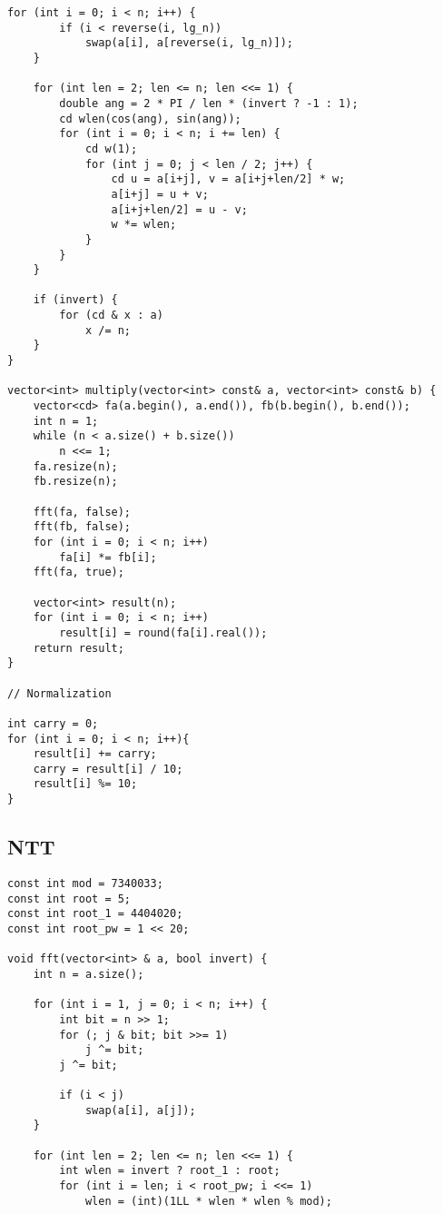 \documentclass[10pt]{article}
\begin{document}
\begin{multicols*}{2}
\begin{lstlisting}[style=compactcpp]
    for (int i = 0; i < n; i++) {
        if (i < reverse(i, lg_n))
            swap(a[i], a[reverse(i, lg_n)]);
    }

    for (int len = 2; len <= n; len <<= 1) {
        double ang = 2 * PI / len * (invert ? -1 : 1);
        cd wlen(cos(ang), sin(ang));
        for (int i = 0; i < n; i += len) {
            cd w(1);
            for (int j = 0; j < len / 2; j++) {
                cd u = a[i+j], v = a[i+j+len/2] * w;
                a[i+j] = u + v;
                a[i+j+len/2] = u - v;
                w *= wlen;
            }
        }
    }

    if (invert) {
        for (cd & x : a)
            x /= n;
    }
}

vector<int> multiply(vector<int> const& a, vector<int> const& b) {
    vector<cd> fa(a.begin(), a.end()), fb(b.begin(), b.end());
    int n = 1;
    while (n < a.size() + b.size()) 
        n <<= 1;
    fa.resize(n);
    fb.resize(n);

    fft(fa, false);
    fft(fb, false);
    for (int i = 0; i < n; i++)
        fa[i] *= fb[i];
    fft(fa, true);

    vector<int> result(n);
    for (int i = 0; i < n; i++)
        result[i] = round(fa[i].real());
    return result;
}

// Normalization

int carry = 0;
for (int i = 0; i < n; i++){
    result[i] += carry;
    carry = result[i] / 10;
    result[i] %= 10;
}

\end{lstlisting}

\subsection{NTT}

\begin{lstlisting}[style=compactcpp]
const int mod = 7340033;
const int root = 5;
const int root_1 = 4404020;
const int root_pw = 1 << 20;

void fft(vector<int> & a, bool invert) {
    int n = a.size();

    for (int i = 1, j = 0; i < n; i++) {
        int bit = n >> 1;
        for (; j & bit; bit >>= 1)
            j ^= bit;
        j ^= bit;

        if (i < j)
            swap(a[i], a[j]);
    }

    for (int len = 2; len <= n; len <<= 1) {
        int wlen = invert ? root_1 : root;
        for (int i = len; i < root_pw; i <<= 1)
            wlen = (int)(1LL * wlen * wlen % mod);


\end{lstlisting}
\end{multicols*}
\end{document}
